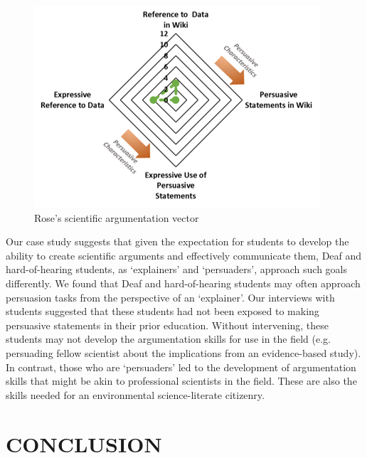 \documentclass[11.5pt]{sig-alternate} %
\begin{document}
\begin{large}
\begin{figure}[h]
    \centering
    \includegraphics[width=1\linewidth]{Fig 4.png}
    \caption{Rose’s scientific argumentation vector}
\end{figure}
\newpage
Our case study suggests that given the expectation for students to develop the ability to create scientific arguments and effectively communicate them, Deaf and hard-of-hearing students, as ‘explainers’ and ‘persuaders’, approach such goals differently. We found that Deaf and hard-of-hearing students may often approach persuasion tasks from the perspective of an ‘explainer’. Our interviews with students suggested that these students had not been exposed to making persuasive statements in their prior education. Without intervening, these students may not develop the argumentation skills for use in the field (e.g. persuading fellow scientist about the implications from an evidence-based study). In contrast, those who are ‘persuaders’ led to the development of argumentation skills that might be akin to professional scientists in the field. These are also the skills needed for an environmental science-literate citizenry.

\section*{CONCLUSION}


\end{large}
\end{document}
